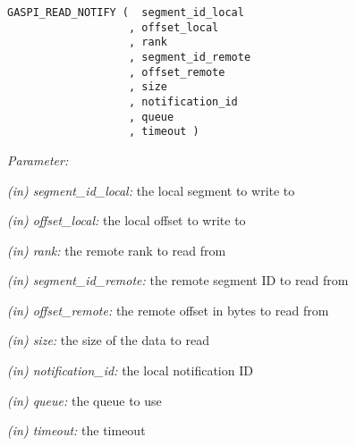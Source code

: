 \documentclass[a4paper]{article}
\newlength{\st}\setlength{\st}{0pt}
\newcommand{\parameter}[1]{{\it #1}}
\newenvironment{cbox}[1]
{\newcommand\colboxcolor{#1}\begin{lrbox}{\riddlebox}\begin{minipage}{\dimexpr\columnwidth-2\fboxsep\relax}}
{\end{minipage}\end{lrbox}\begin{center}\colorbox[HTML]{\colboxcolor}{\usebox{\riddlebox}}\end{center}}
\newcommand{\shortlistbegin}[1]{\begin{trivlist}\setlength{\itemsep}{0pt}\item[]\emph{#1:}}
\newcommand{\shortlistitem}[1]{\item[]#1}
\newcommand{\shortlistend}{\end{trivlist}}
\newenvironment{FDef}{\begin{trivlist}\item[]}{\end{trivlist}}
\newenvironment{FDefSign}{\begin{cbox}{EEEEEE}}{\end{cbox}}
\newcommand{\parameterlistbegin}{\shortlistbegin{Parameter}}
\newcommand{\parameterlistend}{\shortlistend}
\newcommand{\parameterlistitem}[3]{\shortlistitem{\parameter{(#1) #2:} {#3}}}
\begin{document}
\begin{FDef}

\begin{FDefSign}
\begin{verbatim}                                                                                                                                               
GASPI_READ_NOTIFY (  segment_id_local
                   , offset_local
                   , rank
                   , segment_id_remote
                   , offset_remote
                   , size
                   , notification_id
                   , queue
                   , timeout )
\end{verbatim}
\end{FDefSign}
\parameterlistbegin
\parameterlistitem{in}{segment\_id\_local}{the local segment to write to}
\parameterlistitem{in}{offset\_local}{the local offset to write to}
\parameterlistitem{in}{rank}{the remote rank to read from}
\parameterlistitem{in}{segment\_id\_remote}{the remote segment ID to read from}
\parameterlistitem{in}{offset\_remote}{the remote offset in bytes to read from}
\parameterlistitem{in}{size}{the size of the data to read}
\parameterlistitem{in}{notification\_id}{the local notification ID}
\parameterlistitem{in}{queue}{the queue to use}
\parameterlistitem{in}{timeout}{the timeout}
\parameterlistend



\end{FDef}
\end{document}
